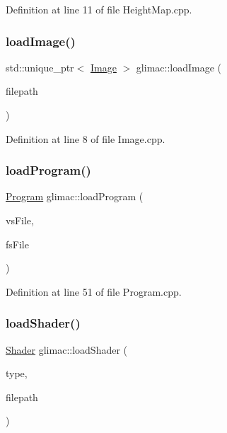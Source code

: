 Definition at line 11 of file Height\+Map.\+cpp.

\mbox{\label{namespaceglimac_a7d92f451f5235a3299fa0faef1a335f5}} 
\subsubsection{\texorpdfstring{load\+Image()}{loadImage()}}
{\footnotesize\ttfamily std\+::unique\+\_\+ptr$<$ \hyperlink{classglimac_1_1_image}{Image} $>$ glimac\+::load\+Image (\begin{DoxyParamCaption}\item[{const \hyperlink{classglimac_1_1_file_path}{File\+Path} \&}]{filepath }\end{DoxyParamCaption})}



Definition at line 8 of file Image.\+cpp.

\mbox{\label{namespaceglimac_a9c42759cac55f7ef947d2972b19e18a6}} 
\subsubsection{\texorpdfstring{load\+Program()}{loadProgram()}}
{\footnotesize\ttfamily \hyperlink{classglimac_1_1_program}{Program} glimac\+::load\+Program (\begin{DoxyParamCaption}\item[{const \hyperlink{classglimac_1_1_file_path}{File\+Path} \&}]{vs\+File,  }\item[{const \hyperlink{classglimac_1_1_file_path}{File\+Path} \&}]{fs\+File }\end{DoxyParamCaption})}



Definition at line 51 of file Program.\+cpp.

\mbox{\label{namespaceglimac_aa154f6bbc6caafaa2b8aa5e4dc433523}} 
\subsubsection{\texorpdfstring{load\+Shader()}{loadShader()}}
{\footnotesize\ttfamily \hyperlink{classglimac_1_1_shader}{Shader} glimac\+::load\+Shader (\begin{DoxyParamCaption}\item[{G\+Lenum}]{type,  }\item[{const \hyperlink{classglimac_1_1_file_path}{File\+Path} \&}]{filepath }\end{DoxyParamCaption})}



